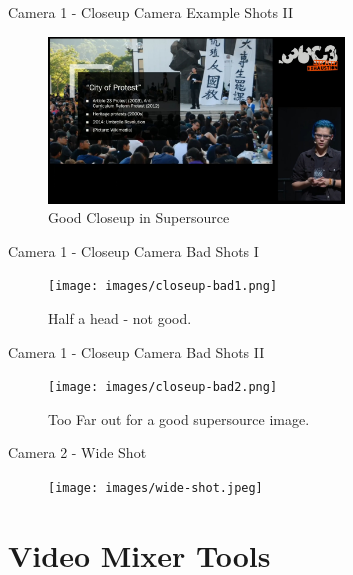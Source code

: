 \documentclass[aspectratio=169]{beamer}
\begin{document}
\begin{frame}{Camera 1 - Closeup Camera}
	Example Shots II
	\begin{figure} 
		\centering
		\includegraphics[width=0.7\textwidth]{images/closeup2.jpg}
		\caption{Good Closeup in Supersource}
	\end{figure}
\end{frame}

\begin{frame}{Camera 1 - Closeup Camera}
	Bad Shots I
	\begin{figure} 
		\centering
		\texttt{[image: images/closeup-bad1.png]}
		\caption{Half a head - not good.}
	\end{figure}
\end{frame}

\begin{frame}{Camera 1 - Closeup Camera}
	Bad Shots II
	\begin{figure} 
		\centering
		\texttt{[image: images/closeup-bad2.png]}
		\caption{Too Far out for a good supersource image.}
	\end{figure}
\end{frame}

\begin{frame}{Camera 2 - Wide Shot}
	\begin{figure} 
		\centering
		\texttt{[image: images/wide-shot.jpeg]}
	\end{figure}
\end{frame}


\section{Video Mixer Tools}
\end{document}
